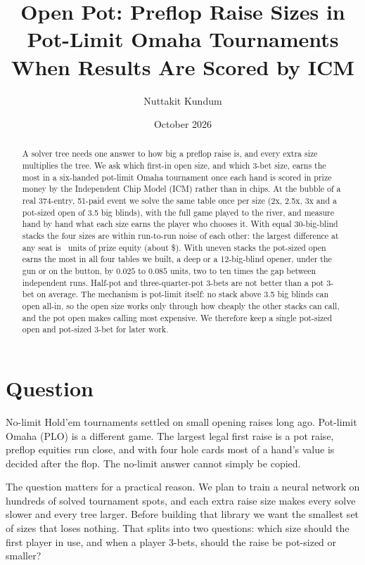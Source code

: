 \documentclass[10pt]{article}
\title{Open Pot: Preflop Raise Sizes in Pot-Limit Omaha Tournaments\\
When Results Are Scored by ICM}
\author{Nuttakit Kundum}
\date{October 2026}
\begin{document}
\maketitle

\begin{abstract}
A solver tree needs one answer to how big a preflop raise is, and every extra size multiplies the
tree. We ask which first-in open size, and which 3-bet size, earns the most in a six-handed
pot-limit Omaha tournament once each hand is scored in prize money by the Independent Chip Model
(ICM) rather than in chips. At the bubble of a real 374-entry, 51-paid event we solve the same
table once per size (2x, 2.5x, 3x and a pot-sized open of 3.5 big blinds), with the full game played
to the river, and measure hand by hand what each size earns the player who chooses it. With equal
30-big-blind stacks the four sizes are within run-to-run noise of each other: the largest
difference at any seat is \EqLargest\ units of prize equity (about \$\EqLargestDollars). With
uneven stacks the pot-sized open earns the most in all four tables we built, a deep or a 12-big-blind
opener, under the gun or on the button, by $0.025$ to $0.085$ units, two to ten times the gap
between independent runs. Half-pot and three-quarter-pot 3-bets are not better than a pot 3-bet on
average. The mechanism is pot-limit itself: no stack above 3.5 big blinds can open all-in, so the
open size works only through how cheaply the other stacks can call, and the pot open makes calling
most expensive. We therefore keep a single pot-sized open and pot-sized 3-bet for later work.
\end{abstract}

\section{Question}
No-limit Hold'em tournaments settled on small opening raises long ago. Pot-limit Omaha (PLO) is a
different game. The largest legal first raise is a pot raise, preflop equities run close, and with
four hole cards most of a hand's value is decided after the flop. The no-limit answer cannot simply
be copied.

The question matters for a practical reason. We plan to train a neural network on hundreds of solved
tournament spots, and each extra raise size makes every solve slower and every tree larger. Before
building that library we want the smallest set of sizes that loses nothing. That splits into two
questions: which size should the first player in use, and when a player 3-bets, should the raise be
pot-sized or smaller?
\end{document}
